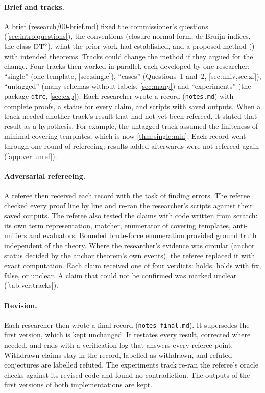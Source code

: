 \paragraph{Brief and tracks.} A brief (\url{research/00-brief.md}) fixed the commissioner's questions
(\cref{sec:intro:questions}), the conventions (closure-normal form, de Bruijn indices, the class $\mathrm{DT}^{\circ}$), what the prior
work had established, and a proposed method (\DTRC) with intended theorems. Tracks could change the method if they argued
for the change. Four tracks then worked in parallel, each developed by one researcher: ``single'' (one template,
\cref{sec:single}), ``cases'' (Questions~1 and~2, \cref{sec:univ,sec:zf}), ``untagged'' (many schemas without labels,
\cref{sec:many}) and ``experiments'' (the package \texttt{dtrc}, \cref{sec:exp}). Each researcher wrote a record
(\texttt{notes.md}) with complete proofs, a status for every claim, and scripts with saved outputs. When a track needed
another track's result that had not yet been refereed, it stated that result as a hypothesis. For example, the untagged
track assumed the finiteness of minimal covering templates, which is now \cref{thm:single:min}. Each record went
through one round of refereeing; results added afterwards were not refereed again (\cref{app:ver:unref}).

\paragraph{Adversarial refereeing.} A referee then received each record with the task of finding errors. The referee
checked every proof line by line and re-ran the researcher's scripts against their saved outputs. The referee also tested
the claims with code written from scratch: its own term representation, matcher, enumerator of covering templates,
anti-unifiers and evaluators. Bounded brute-force enumeration provided ground truth independent of the theory. Where the
researcher's evidence was circular (anchor status decided by the anchor theorem's own events), the referee replaced it with
exact computation. Each claim received one of four verdicts: holds, holds with fix, false, or unclear. A claim that
could not be confirmed was marked unclear (\cref{tab:ver:tracks}).

\paragraph{Revision.} Each researcher then wrote a final record (\texttt{notes-final.md}). It supersedes the first
version, which is kept unchanged. It restates every result, corrected where needed, and ends with a verification log
that answers every referee point. Withdrawn claims stay in the record, labelled as withdrawn, and refuted conjectures are
labelled refuted. The experiments track re-ran the referee's oracle checks against its revised code and found no
contradiction. The outputs of the first versions of both implementations are kept.

